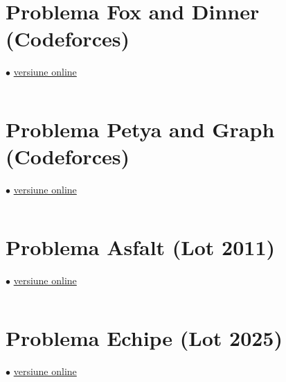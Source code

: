 \documentclass[../main.tex]{subfiles}
\begin{document}
\section{Problema Fox and Dinner (Codeforces)}
\label{code:fox-and-dinner}
$\bullet$
\href{https://codeforces.com/contest/510/submission/318217176}{versiune online}

\inputminted{cpp}{../src/graphs/fox-and-dinner.cpp}


\section{Problema Petya and Graph (Codeforces)}
\label{code:petya-and-graph}
$\bullet$
\href{https://codeforces.com/contest/1082/submission/373060967}{versiune online}

\inputminted{cpp}{../src/graphs/petya-and-graph.cpp}


\section{Problema Asfalt (Lot 2011)}
\label{code:asfalt}
$\bullet$
\href{https://kilonova.ro/submissions/1097989}{versiune online}

\inputminted{cpp}{../src/graphs/asfalt.cpp}


\section{Problema Echipe (Lot 2025)}
\label{code:echipe}
$\bullet$
\href{https://kilonova.ro/submissions/789132}{versiune online}

\inputminted{cpp}{../src/graphs/echipe.cpp}
\end{document}
